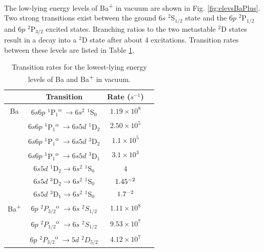 The low-lying energy levels of Ba\textsuperscript{+} in vacuum are shown in Fig. \ref{fig:elevsBaPlus}.  Two strong transitions exist between the ground $6s$ $^{2}$S$_{1/2}$ state and the $6p$ $^{2}$P$_{1/2}$ and $6p$ $^{2}$P$_{3/2}$ excited states.  Branching ratios to the two metastable $^{2}$D states result in a decay into a $^{2}$D state after about 4 excitations.  Transition rates between these levels are listed in Table \ref{table:BaTransitions}.    

\begin{table}[!htbp]
\caption{Transition rates for the lowest-lying energy levels of Ba and Ba\textsuperscript{+} in vacuum.} %
\label{table:BaTransitions}
\begin{tabular}{c|c|c c}
& Transition & Rate ($s^{-1}$) &  \\
\hline
Ba & $6s6p$ $^{1}$P$_{1}$\textsuperscript{o} $\rightarrow 6s^{2}$ $^{1}$S$_{0}$ & $1.19 \times 10^{8}$ & \cite{BaAllowedTransitions} \\
& $6s6p$ $^{1}$P$_{1}$\textsuperscript{o} $\rightarrow 6s5d$ $^{1}$D$_{2}$ & $2.50 \times 10^{5}$ & \cite{BaAllowedTransitions} \\
& $6s6p$ $^{1}$P$_{1}$\textsuperscript{o} $\rightarrow 6s5d$ $^{3}$D$_{2}$ & $1.1 \times 10^{5}$ & \cite{BaAllowedTransitions} \\
& $6s6p$ $^{1}$P$_{1}$\textsuperscript{o} $\rightarrow 6s5d$ $^{3}$D$_{1}$ & $3.1 \times 10^{3}$ & \cite{BaAllowedTransitions} \\
& $6s5d$ $^{1}$D$_{2} \rightarrow 6s^{2}$ $^{1}$S$_{0}$ & $4$ & \cite{Ba1D2and3D1} \\
& $6s5d$ $^{3}$D$_{2} \rightarrow 6s^{2}$ $^{1}$S$_{0}$ & $1.45 \time 10^{-2}$ & \cite{Ba3D2} \\
& $6s5d$ $^{3}$D$_{1} \rightarrow 6s^{2}$ $^{1}$S$_{0}$ & $1.7 \time 10^{-2}$ & \cite{Ba1D2and3D1} \\
\hline
Ba\textsuperscript{+} & $6p$ $^{2}P_{3/2}$\textsuperscript{o} $\rightarrow 6s $ $^{2}S_{1/2}$ & $1.11 \times 10^{8}$ & \cite{BaAllowedTransitions} \\
& $6p$ $^{2}P_{1/2}$\textsuperscript{o} $\rightarrow 6s$ $^{2}S_{1/2}$ & $9.53 \times 10^{7}$ & \cite{BaAllowedTransitions} \\
& $6p$ $^{2}P_{3/2}$\textsuperscript{o} $\rightarrow 5d$ $^{2}D_{5/2}$ & $4.12 \times 10^{7}$ & \cite{BaAllowedTransitions} \\

\end{tabular}
\end{table}
